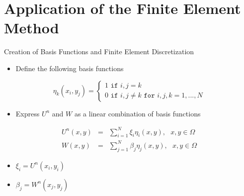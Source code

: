 \documentclass[10pt]{beamer}
\begin{document}
\section{Application of the Finite Element Method}
\begin{frame}{Creation of Basis Functions and Finite Element Discretization}
\begin{itemize}
\item Define the following basis functions
\end{itemize}
$$
\eta_{k}\left(x_{i},y_{j}\right)=\begin{cases}
1 \texttt{ if } i,j=k\\
0 \texttt{ if } i,j \neq k \texttt{ for } i,j,k=1,...,N
\end{cases} 
$$

\begin{itemize}
\item Express $U^{n}$ and $W$ as a linear combination of basis functions
\end{itemize}

\begin{eqnarray}\label{UWdiscrete}
U^{n}\left(x,y\right)&=&\sum_{i=1}^{N}\xi_{i}\eta_{i}\left(x,y\right), \texttt{ } x,y \in \Omega \\
\nonumber
W\left(x,y\right)&=&\sum_{j=1}^{N}\beta_{j}\eta_{j}\left(x,y\right), \texttt{ } x,y \in \Omega
\end{eqnarray}

\begin{itemize}
\item $\xi_{i}=U^{n}\left(x_{i},y_{i}\right)$
\item $\beta_{j}=W^{n}\left(x_{j},y_{j}\right)$
\end{itemize}

\end{frame}
\end{document}
